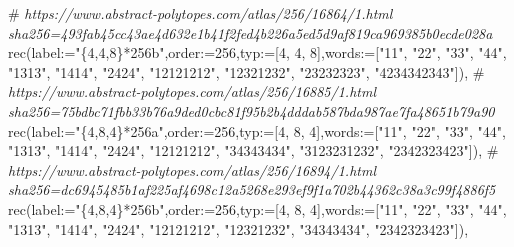 \documentclass[
  10pt,
  letterpaper,
]{article}
\newenvironment{Shaded}{}{}
\newcommand{\CommentTok}[1]{\textcolor[rgb]{0.38,0.63,0.69}{\textit{#1}}}
\newcommand{\ExtensionTok}[1]{#1}
\newcommand{\FloatTok}[1]{\textcolor[rgb]{0.25,0.63,0.44}{#1}}
\newcommand{\NormalTok}[1]{#1}
\newcommand{\OperatorTok}[1]{\textcolor[rgb]{0.40,0.40,0.40}{#1}}
\newcommand{\StringTok}[1]{\textcolor[rgb]{0.25,0.44,0.63}{#1}}
\newcommand{\VariableTok}[1]{\textcolor[rgb]{0.10,0.09,0.49}{#1}}
\begin{document}
\begin{Shaded}
\begin{Highlighting}[]
\NormalTok{\#}\CommentTok{ https://www.abstract{-}polytopes.com/atlas/256/16864/1.html sha256=493fab45cc43ae4d632e1b41f2fed4b226a5ed5d9af819ca969385b0ecde028a}
\ExtensionTok{rec}\NormalTok{(}\VariableTok{label}\OperatorTok{:=}\StringTok{"\{4,4,8\}*256b"}\OperatorTok{,}\VariableTok{order}\OperatorTok{:=}\FloatTok{256}\OperatorTok{,}\VariableTok{typ}\OperatorTok{:=}\NormalTok{[}\FloatTok{4}\OperatorTok{,} \FloatTok{4}\OperatorTok{,} \FloatTok{8}\NormalTok{]}\OperatorTok{,}\VariableTok{words}\OperatorTok{:=}\NormalTok{[}\StringTok{"11"}\OperatorTok{,} \StringTok{"22"}\OperatorTok{,} \StringTok{"33"}\OperatorTok{,} \StringTok{"44"}\OperatorTok{,} \StringTok{"1313"}\OperatorTok{,} \StringTok{"1414"}\OperatorTok{,} \StringTok{"2424"}\OperatorTok{,} \StringTok{"12121212"}\OperatorTok{,} \StringTok{"12321232"}\OperatorTok{,} \StringTok{"23232323"}\OperatorTok{,} \StringTok{"4234342343"}\NormalTok{])}\OperatorTok{,}
\NormalTok{\#}\CommentTok{ https://www.abstract{-}polytopes.com/atlas/256/16885/1.html sha256=75bdbc71fbb33b76a9ded0cbc81f95b2b4dddab587bda987ae7fa48651b79a90}
\ExtensionTok{rec}\NormalTok{(}\VariableTok{label}\OperatorTok{:=}\StringTok{"\{4,8,4\}*256a"}\OperatorTok{,}\VariableTok{order}\OperatorTok{:=}\FloatTok{256}\OperatorTok{,}\VariableTok{typ}\OperatorTok{:=}\NormalTok{[}\FloatTok{4}\OperatorTok{,} \FloatTok{8}\OperatorTok{,} \FloatTok{4}\NormalTok{]}\OperatorTok{,}\VariableTok{words}\OperatorTok{:=}\NormalTok{[}\StringTok{"11"}\OperatorTok{,} \StringTok{"22"}\OperatorTok{,} \StringTok{"33"}\OperatorTok{,} \StringTok{"44"}\OperatorTok{,} \StringTok{"1313"}\OperatorTok{,} \StringTok{"1414"}\OperatorTok{,} \StringTok{"2424"}\OperatorTok{,} \StringTok{"12121212"}\OperatorTok{,} \StringTok{"34343434"}\OperatorTok{,} \StringTok{"3123231232"}\OperatorTok{,} \StringTok{"2342323423"}\NormalTok{])}\OperatorTok{,}
\NormalTok{\#}\CommentTok{ https://www.abstract{-}polytopes.com/atlas/256/16894/1.html sha256=dc6945485b1af225af4698c12a5268e293ef9f1a702b44362c38a3c99f4886f5}
\ExtensionTok{rec}\NormalTok{(}\VariableTok{label}\OperatorTok{:=}\StringTok{"\{4,8,4\}*256b"}\OperatorTok{,}\VariableTok{order}\OperatorTok{:=}\FloatTok{256}\OperatorTok{,}\VariableTok{typ}\OperatorTok{:=}\NormalTok{[}\FloatTok{4}\OperatorTok{,} \FloatTok{8}\OperatorTok{,} \FloatTok{4}\NormalTok{]}\OperatorTok{,}\VariableTok{words}\OperatorTok{:=}\NormalTok{[}\StringTok{"11"}\OperatorTok{,} \StringTok{"22"}\OperatorTok{,} \StringTok{"33"}\OperatorTok{,} \StringTok{"44"}\OperatorTok{,} \StringTok{"1313"}\OperatorTok{,} \StringTok{"1414"}\OperatorTok{,} \StringTok{"2424"}\OperatorTok{,} \StringTok{"12121212"}\OperatorTok{,} \StringTok{"12321232"}\OperatorTok{,} \StringTok{"34343434"}\OperatorTok{,} \StringTok{"2342323423"}\NormalTok{])}\OperatorTok{,}

\end{Highlighting}
\end{Shaded}
\end{document}
